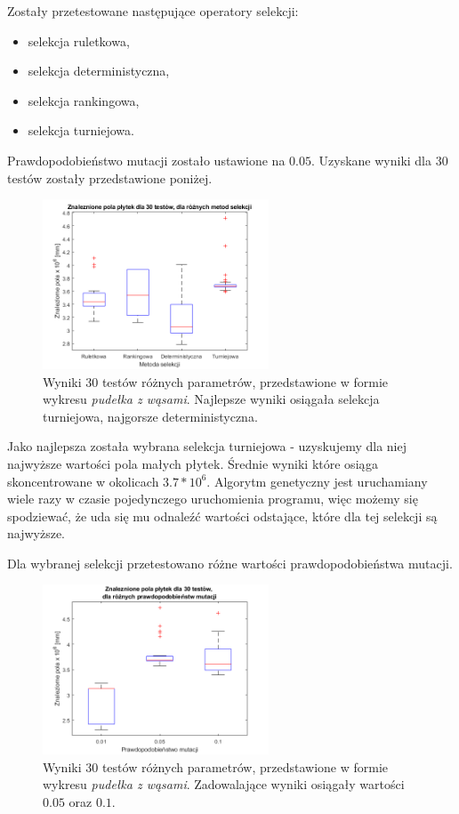 \documentclass[11pt]{article}
\begin{document}
Zostały przetestowane następujące operatory selekcji:
\begin{itemize}
\item selekcja ruletkowa,
\item selekcja deterministyczna,
\item selekcja rankingowa,
\item selekcja turniejowa.
\end{itemize}

Prawdopodobieństwo mutacji zostało ustawione na $0.05$. Uzyskane wyniki dla 30 testów zostały przedstawione poniżej.

\begin{figure}[H]
\centering
\includegraphics[width=0.6\textwidth]{test_selekcja.png}
\caption{Wyniki 30 testów różnych parametrów, przedstawione w formie wykresu \textit{pudełka z wąsami}. Najlepsze wyniki osiągała selekcja turniejowa, najgorsze deterministyczna. }
\end{figure}

Jako najlepsza została wybrana selekcja turniejowa - uzyskujemy dla niej najwyższe wartości pola małych płytek. Średnie wyniki które osiąga skoncentrowane w okolicach $3.7 * 10^6$.  Algorytm genetyczny jest uruchamiany wiele razy w czasie pojedynczego uruchomienia programu, więc możemy się spodziewać, że uda się mu odnaleźć wartości odstające, które dla tej selekcji są najwyższe.

Dla wybranej selekcji przetestowano różne wartości prawdopodobieństwa mutacji.

\begin{figure}[H]
\centering
\includegraphics[width=0.6\textwidth]{test_mutacja.png}
\caption{Wyniki 30 testów różnych parametrów, przedstawione w formie wykresu \textit{pudełka z wąsami}. Zadowalające wyniki osiągały wartości $0.05$ oraz $0.1$. }
\end{figure}
\end{document}
